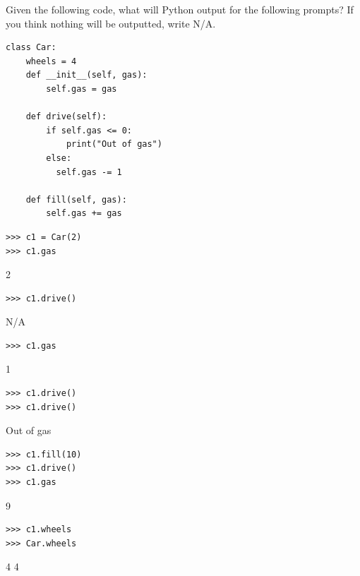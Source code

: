 \begin{blocksection}
\question Given the following code, what will Python output for the following prompts? If you think nothing will be outputted, write N/A.

\begin{lstlisting}
class Car:
    wheels = 4
    def __init__(self, gas):
        self.gas = gas

    def drive(self):
        if self.gas <= 0:
            print("Out of gas")
        else:
	      self.gas -= 1
    
    def fill(self, gas):
        self.gas += gas

\end{lstlisting}
\end{blocksection}

\begin{blocksection}
\begin{lstlisting}
>>> c1 = Car(2)
>>> c1.gas
\end{lstlisting}
\begin{solution}[.2in]
2
\end{solution}

\begin{lstlisting}
>>> c1.drive()
\end{lstlisting}
\begin{solution}[.2in]
N/A
\end{solution}

\begin{lstlisting}
>>> c1.gas
\end{lstlisting}
\begin{solution}[.2in]
1
\end{solution}

\begin{lstlisting}
>>> c1.drive()
>>> c1.drive()
\end{lstlisting}
\begin{solution}[.2in]
Out of gas
\end{solution}

\begin{lstlisting}
>>> c1.fill(10)
>>> c1.drive()
>>> c1.gas
\end{lstlisting}
\begin{solution}[.2in]
9
\end{solution}

\begin{lstlisting}
>>> c1.wheels
>>> Car.wheels
\end{lstlisting}
\begin{solution}[.2in]
4
4
\end{solution}

\end{blocksection}
